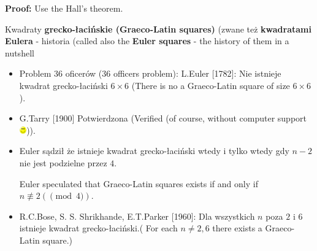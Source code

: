 \documentclass{beamer}
\begin{document}
\begin{frame}
  {\bf Proof:} Use the Hall's theorem.
  \end{frame}

\begin{frame}
  \begin{block}{Kwadraty {\bf grecko-łacińskie (Graeco-Latin squares)}
      (zwane też {\bf kwadratami Eulera}
      - historia (called also the {\bf Euler squares} - the history of them in a nutshell}
  \end{block}

  \begin{itemize}
  \item<1->
    {\color{blue} Problem 36 oficerów (36 officers problem)}:
    L.Euler [1782]: Nie istnieje kwadrat grecko-łaciński $6\times 6$
      (There is no a Graeco-Latin square of size $6 \times 6$).
  \item<2->G.Tarry [1900] Potwierdzona (Verified (of course, without computer
    support \includegraphics[height=3mm]{smile.png})).
  \item<3-> Euler sądził że istnieje kwadrat grecko-łaciński wtedy
    i tylko wtedy gdy $n - 2$ nie jest podzielne przez $4$.

    Euler speculated that Graeco-Latin squares exists if and
    only if $n \not\equiv 2 (\pmod 4)$.
  \item<4-> R.C.Bose, S. S. Shrikhande, E.T.Parker [1960]:
    Dla wszystkich $n$ poza $2$ i $6$ istnieje kwadrat
    grecko-łaciński.( For each $n \not= 2,6$ there exists a
    Graeco-Latin square.)
    \end{itemize}
\end{frame}
\end{document}
